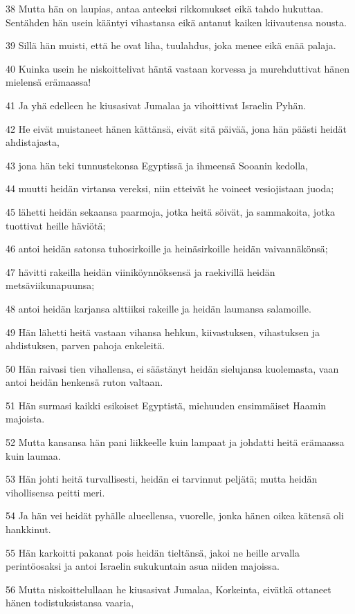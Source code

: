 \par 38 Mutta hän on laupias, antaa anteeksi rikkomukset eikä tahdo hukuttaa. Sentähden hän usein kääntyi vihastansa eikä antanut kaiken kiivautensa nousta.
\par 39 Sillä hän muisti, että he ovat liha, tuulahdus, joka menee eikä enää palaja.
\par 40 Kuinka usein he niskoittelivat häntä vastaan korvessa ja murehduttivat hänen mielensä erämaassa!
\par 41 Ja yhä edelleen he kiusasivat Jumalaa ja vihoittivat Israelin Pyhän.
\par 42 He eivät muistaneet hänen kättänsä, eivät sitä päivää, jona hän päästi heidät ahdistajasta,
\par 43 jona hän teki tunnustekonsa Egyptissä ja ihmeensä Sooanin kedolla,
\par 44 muutti heidän virtansa vereksi, niin etteivät he voineet vesiojistaan juoda;
\par 45 lähetti heidän sekaansa paarmoja, jotka heitä söivät, ja sammakoita, jotka tuottivat heille häviötä;
\par 46 antoi heidän satonsa tuhosirkoille ja heinäsirkoille heidän vaivannäkönsä;
\par 47 hävitti rakeilla heidän viiniköynnöksensä ja raekivillä heidän metsäviikunapuunsa;
\par 48 antoi heidän karjansa alttiiksi rakeille ja heidän laumansa salamoille.
\par 49 Hän lähetti heitä vastaan vihansa hehkun, kiivastuksen, vihastuksen ja ahdistuksen, parven pahoja enkeleitä.
\par 50 Hän raivasi tien vihallensa, ei säästänyt heidän sielujansa kuolemasta, vaan antoi heidän henkensä ruton valtaan.
\par 51 Hän surmasi kaikki esikoiset Egyptistä, miehuuden ensimmäiset Haamin majoista.
\par 52 Mutta kansansa hän pani liikkeelle kuin lampaat ja johdatti heitä erämaassa kuin laumaa.
\par 53 Hän johti heitä turvallisesti, heidän ei tarvinnut peljätä; mutta heidän vihollisensa peitti meri.
\par 54 Ja hän vei heidät pyhälle alueellensa, vuorelle, jonka hänen oikea kätensä oli hankkinut.
\par 55 Hän karkoitti pakanat pois heidän tieltänsä, jakoi ne heille arvalla perintöosaksi ja antoi Israelin sukukuntain asua niiden majoissa.
\par 56 Mutta niskoittelullaan he kiusasivat Jumalaa, Korkeinta, eivätkä ottaneet hänen todistuksistansa vaaria,
